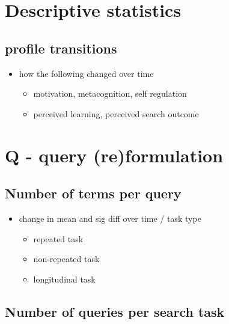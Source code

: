 \documentclass[letterpaper, nobind]{templates/ociamthesis}
\providecommand{\tightlist}{%
  \setlength{\itemsep}{0pt}\setlength{\parskip}{0pt}}
\begin{document}
\hypertarget{descriptive-statistics}{%
\section{Descriptive statistics}\label{descriptive-statistics}}

\hypertarget{profile-transitions}{%
\subsection{profile transitions}\label{profile-transitions}}

\begin{itemize}
\tightlist
\item
  how the following changed over time

  \begin{itemize}
  \tightlist
  \item
    motivation, metacognition, self regulation
  \item
    perceived learning, perceived search outcome
  \end{itemize}
\end{itemize}

\hypertarget{q---query-reformulation}{%
\section{Q - query (re)formulation}\label{q---query-reformulation}}

\hypertarget{number-of-terms-per-query}{%
\subsection{Number of terms per query}\label{number-of-terms-per-query}}

\begin{itemize}
\tightlist
\item
  change in mean and sig diff over time / task type

  \begin{itemize}
  \tightlist
  \item
    repeated task
  \item
    non-repeated task
  \item
    longitudinal task
  \end{itemize}
\end{itemize}

\hypertarget{number-of-queries-per-search-task}{%
\subsection{Number of queries per search task}\label{number-of-queries-per-search-task}}
\end{document}
